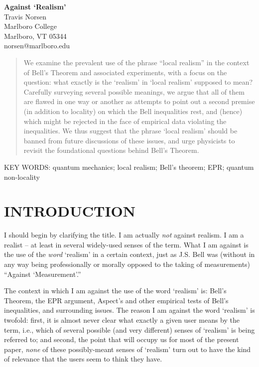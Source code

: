\documentclass[12pt]{article}
\begin{document}
\begin{center}
\LARGE
\textbf{Against `Realism'} \\[1cm]
\large
Travis Norsen \\[0.5cm]
\normalsize
Marlboro College \\ 
 Marlboro, VT  05344 \\ norsen@marlboro.edu \\
\end{center}

\bigskip
\bigskip

\begin{quote}
We examine the prevalent use of the phrase ``local realism'' in the
context of Bell's Theorem and associated experiments, with a focus on
the question:  what exactly is the `realism' in `local realism' 
supposed to mean?  Carefully surveying several possible
meanings, we argue that all of them are flawed in one way or
another as attempts to point out a second premise (in addition to
locality) on which the Bell inequalities rest, and (hence) which might
be rejected in the face of empirical data violating the inequalities.  
We thus suggest that the phrase `local realism' 
should be banned from future discussions of these issues, and urge
physicists to revisit the foundational questions behind Bell's Theorem.
\end{quote}

\medskip



\noindent KEY WORDS: quantum mechanics; local realism; Bell's theorem; 
EPR; quantum non-locality

\medskip



\section{INTRODUCTION}
\label{sec1}

I should begin by clarifying the title.  I am
actually \emph{not} against realism.  I am a realist -- at
least in several widely-used senses of the term.  What
I am against is the use of the \emph{word} `realism' in a certain
context, just as J.S. Bell was (without in any way being
professionally or morally opposed to the taking of measurements)
``Against `Measurement'.''  \cite[pages 213-231]{bell}  

The context in which I am against the use of the word `realism' 
is:  Bell's Theorem, the EPR argument, Aspect's and other
empirical tests of Bell's
inequalities, and surrounding issues.  The reason I am against
the word `realism' is twofold:  first, it is almost never clear what
exactly a given user means by the term, i.e., which of several
possible (and very different) senses of `realism' is being referred
to; and second, the point that will occupy us for most of the present
paper, \emph{none} of these possibly-meant senses of `realism' turn out
to have the kind of relevance that the users seem to think they 
have.
\end{document}
